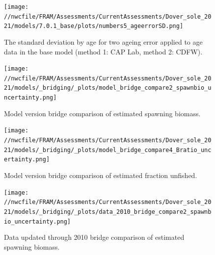 \documentclass[11pt,
  english,
  a4paper,
]{article}
\begin{document}
\tagmcend\tagstructend


\begin{figure}
\centering
\texttt{[image: //nwcfile/FRAM/Assessments/CurrentAssessments/Dover\_sole\_2021/models/7.0.1\_base/plots/numbers5\_ageerrorSD.png]}
\caption{The standard deviation by age for two ageing error applied to age data in the base model (method 1: CAP Lab, method 2: CDFW).\label{fig:age-error}}
\end{figure}

\tagmcend\tagstructend


\begin{figure}
\centering
\texttt{[image: //nwcfile/FRAM/Assessments/CurrentAssessments/Dover\_sole\_2021/models/\_bridging/\_plots/model\_bridge\_compare2\_spawnbio\_uncertainty.png]}
\caption{Model version bridge comparison of estimated spawning biomass.\label{fig:bridge-ssb}}
\end{figure}

\tagmcend\tagstructend


\begin{figure}
\centering
\texttt{[image: //nwcfile/FRAM/Assessments/CurrentAssessments/Dover\_sole\_2021/models/\_bridging/\_plots/model\_bridge\_compare4\_Bratio\_uncertainty.png]}
\caption{Model version bridge comparison of estimated fraction unfished.\label{fig:bridge-depl}}
\end{figure}

\tagmcend\tagstructend


\begin{figure}
\centering
\texttt{[image: //nwcfile/FRAM/Assessments/CurrentAssessments/Dover\_sole\_2021/models/\_bridging/\_plots/data\_2010\_bridge\_compare2\_spawnbio\_uncertainty.png]}
\caption{Data updated through 2010 bridge comparison of estimated spawning biomass.\label{fig:data-bridge-ssb}}
\end{figure}
\end{document}
